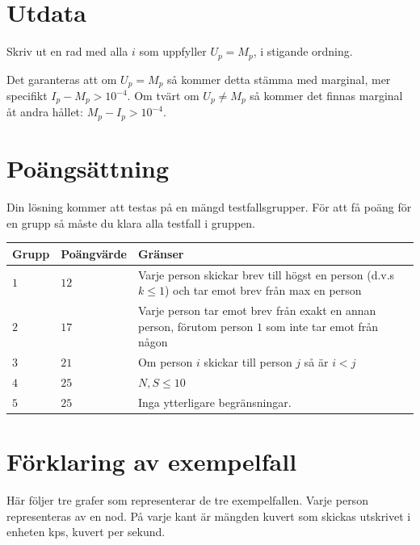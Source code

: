 \section*{Utdata}
Skriv ut en rad med alla $i$ som uppfyller $U_p = M_p$, i stigande ordning.

Det garanteras att om $U_p = M_p$ så kommer detta stämma med marginal, mer specifikt $I_p - M_p > 10^{-4}$.
Om tvärt om $U_p \neq M_p$ så kommer det finnas marginal åt andra hållet: $M_p - I_p > 10^{-4}$.

\section*{Poängsättning}
Din lösning kommer att testas på en mängd testfallsgrupper.
För att få poäng för en grupp så måste du klara alla testfall i gruppen.

\noindent
\begin{tabular}{| l | l | l |}
\hline
Grupp & Poängvärde & Gränser \\ \hline
$1$    & $12$       &  Varje person skickar brev till högst en person (d.v.s $k \leq 1$) och tar emot brev från max en person \\ \hline 
$2$    & $17$       &  Varje person tar emot brev från exakt en annan person, förutom person $1$ som inte tar emot från någon \\ \hline 
$3$    & $21$       &  Om person $i$ skickar till person $j$ så är $i < j$ \\ \hline
$4$    & $25$       &  $N, S \le 10$ \\ \hline
$5$    & $25$       &  Inga ytterligare begränsningar. \\ \hline
\end{tabular}

\section*{Förklaring av exempelfall}
Här följer tre grafer som representerar de tre exempelfallen. Varje person representeras av en nod. På varje kant är mängden kuvert som skickas utskrivet i enheten kps, kuvert per sekund.


